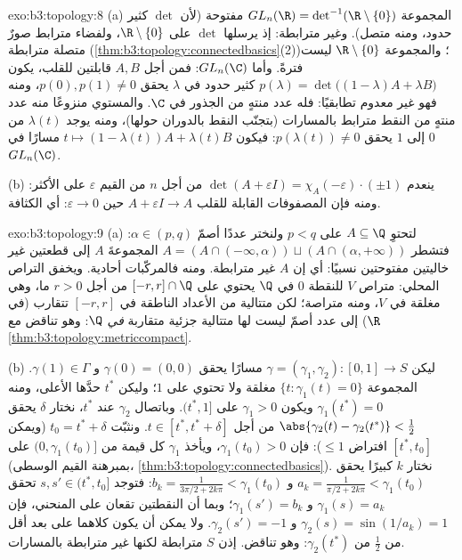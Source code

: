 \begin{solution}{exo:b3:topology:8}
(a) المجموعة $GL_n(\R) = \det^{-1}(\R\setminus\{0\})$ مفتوحة (لأن $\det$ كثير حدود، ومنه متصل).
وغير مترابطة: إذ يرسلها $\det$ على $\R\setminus\{0\}$، ولفضاء مترابط صورٌ
متصلة مترابطة (\cref{thm:b3:topology:connectedbasics}(2))؛ والمجموعة $\R\setminus\{0\}$ ليست فترةً.
وأما $GL_n(\C)$: فمن أجل $A, B$ قابلتين للقلب، يكون $p(\lambda) = \det\bigl((1-\lambda)A + \lambda
B\bigr)$
كثير حدود في $\lambda$ يحقق $p(0), p(1) \neq 0$، ومنه فهو غير معدوم
تطابقيًا: فله عدد منتهٍ من الجذور في $\C$. والمستوي منزوعًا منه
عدد منتهٍ من النقط مترابط بالمسارات (بتجنّب النقط بالدوران
حولها)، ومنه يوجد  $\lambda(t)$ من $0$ إلى $1$ يحقق $p(\lambda(t)) \neq 0$:
فيكون $t \mapsto
(1-\lambda(t))A + \lambda(t)B$ مسارًا في $GL_n(\C)$.

(b) ينعدم $\det(A + \varepsilon I) = \chi_A(-\varepsilon)\cdot(\pm1)$ من أجل $n$ من القيم $\varepsilon$ على الأكثر:
ومنه فإن المصفوفات القابلة للقلب $A + \varepsilon I \to A$ حين $\varepsilon \to 0$: أي
الكثافة.
\end{solution}

\begin{solution}{exo:b3:topology:9}
(a) لتحتوِ $A \subseteq \Q$ على $p < q$ ولنختر عددًا أصمّ
$\alpha \in (p, q)$: فتشطر $A = (A \cap (-\infty, \alpha)) \sqcup
(A\cap(\alpha, +\infty))$ المجموعةَ $A$ إلى قطعتين غير خاليتين
مفتوحتين نسبيًا: أي إن $A$ غير مترابطة. ومنه فالمركّبات أحادية.
ويخفق التراص المحلي:  متراص $V$ للنقطة $0$ في $\Q$ يحتوي
على $[-r, r]\cap\Q$ من أجل $r > 0$ ما، وهي مغلقة في $V$، ومنه
متراصة؛ لكن متتالية من الأعداد الناطقة في $[-r,r]$ تتقارب (في
$\R$) إلى عدد أصمّ ليست لها متتالية جزئية متقاربة \emph{في
$\Q$}: وهو تناقض مع \cref{thm:b3:topology:metriccompact}.

(b) ليكن $\gamma = (\gamma_1, \gamma_2) \colon [0,1] \to S$ مسارًا يحقق $\gamma(0) = (0,0)$ و $\gamma(1) \in \Gamma$. المجموعة $\{t : \gamma_1(t) = 0\}$
مغلقة ولا تحتوي على $1$؛ وليكن $t^*$ حدَّها الأعلى، ومنه $\gamma_1(t^*) = 0$
ويكون $\gamma_1 > 0$ على $(t^*, 1]$. وباتصال $\gamma_2$ عند
$t^*$، نختار $\delta$ يحقق $\abs{\gamma_2(t) -
\gamma_2(t^*)} < \tfrac12$ من أجل $t \in [t^*, t^* + \delta]$. ونثبّت $t_0 = t^* + \delta$
(ويمكن افتراض $\leq 1$): فإن $\gamma_1(t_0) > 0$، ويأخذ $\gamma_1$ كل قيمة
من $(0, \gamma_1(t_0)]$ على $[t^*, t_0]$ (بمبرهنة القيم الوسطى،
\cref{thm:b3:topology:connectedbasics}). نختار $k$ كبيرًا يحقق $a_k = \frac1{\pi/2 + 2k\pi} < \gamma_1(t_0)$ و $b_k =
\frac1{3\pi/2 + 2k\pi} < \gamma_1(t_0)$: فتوجد
$s, s' \in
(t^*, t_0]$ تحقق $\gamma_1(s) = a_k$ و $\gamma_1(s') = b_k$؛ وبما أن النقطتين تقعان على
المنحني، فإن $\gamma_2(s) = \sin(1/a_k) =
1$ و $\gamma_2(s') = -1$. ولا يمكن أن يكون كلاهما على
بعد أقل من $\frac12$ من $\gamma_2(t^*)$: وهو تناقض. إذن $S$
مترابطة لكنها غير مترابطة بالمسارات.
\end{solution}

